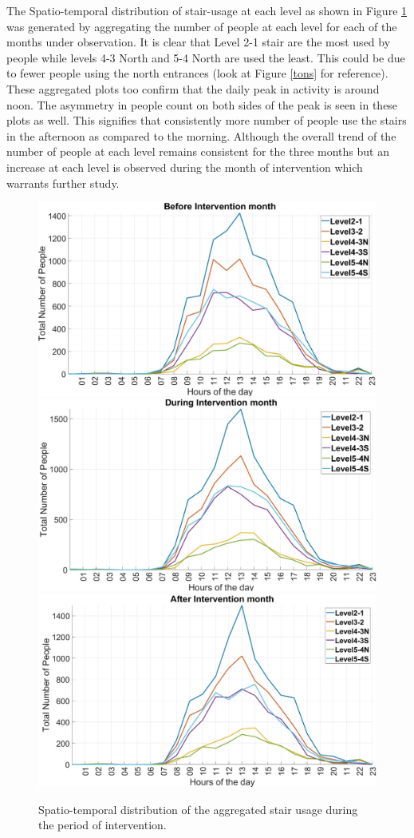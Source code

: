 The Spatio-temporal distribution of stair-usage at each level as shown in Figure \ref{spa1} was generated by aggregating the number of people at each level for each of the months under observation. It is clear that Level 2-1 stair are the most used by people while levels 4-3 North and 5-4 North are used the least. This could be due to fewer people using the north entrances (look at Figure \ref{tons} for reference). These aggregated plots too confirm that the daily peak in activity is around noon. The asymmetry in people count on both sides of the peak is seen in these plots as well. This signifies that consistently more number of people use the stairs in the afternoon as compared to the morning. Although the overall trend of the number of people at each level remains consistent for the three months but an increase at each level is observed during the month of intervention which warrants further study.

\begin{figure}[tpb]
    \includegraphics[width=.5\textwidth]{image/before_int.jpg}\hfill
    \includegraphics[width=.5\textwidth]{image/during_int.jpg}\hfill\centering
    \includegraphics[width=.5\textwidth]{image/after_int.jpg}
    \\[\smallskipamount]
    \caption{Spatio-temporal distribution of the aggregated stair usage during the period of intervention.}
    \label{spa1}
\end{figure}

